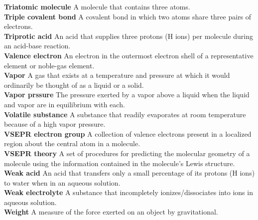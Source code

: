 \documentclass[10pt, roman]{article}
\begin{document}
\noindent \begin{minipage}[c]{0.30\textwidth}
\textbf{Triatomic molecule} A molecule that contains three atoms. \\
\textbf{Triple covalent bond} A covalent bond in which two atoms share three pairs of electrons. \\
\textbf{Triprotic acid} An acid that supplies three protons (H ions) per molecule during an acid-base reaction. \\
\textbf{Valence electron} An electron in the outermost electron shell of a representative element or noble-gas element. \\
\textbf{Vapor} A gas that exists at a temperature and pressure at which it would ordinarily be thought of as a liquid or a solid. \\
\textbf{Vapor prssure} The pressure exerted by a vapor above a liquid when the liquid and vapor are in equilibrium with each. \\
\textbf{Volatile substance} A substance that readily evaporates at room temperature because of a high vapor pressure. \\
\textbf{VSEPR electron group} A collection of valence electrons present in a localized region about the central atom in a molecule. \\
\textbf{VSEPR theory} A set of procedures for predicting the molecular geometry of a molecule using the information contained in the molecule’s Lewis structure. \\
\textbf{Weak acid} An acid that transfers only a small percentage of its protons (H ions) to water when in an aqueous solution. \\
\textbf{Weak electrolyte} A substance that incompletely ionizes/dissociates into ions in aqueous solution. \\
\textbf{Weight} A measure of the force exerted on an object by gravitational. \\
\end{minipage}%
\end{document}
